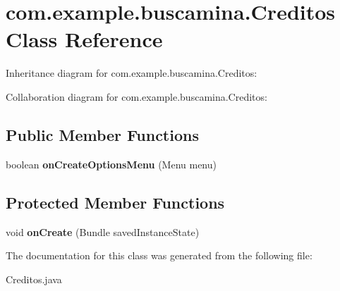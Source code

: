 \section{com.\-example.\-buscamina.\-Creditos Class Reference}
\label{classcom_1_1example_1_1buscamina_1_1_creditos}


Inheritance diagram for com.\-example.\-buscamina.\-Creditos\-:


Collaboration diagram for com.\-example.\-buscamina.\-Creditos\-:
\subsection*{Public Member Functions}
\begin{DoxyCompactItemize}
\item 
boolean {\bfseries on\-Create\-Options\-Menu} (Menu menu)\label{classcom_1_1example_1_1buscamina_1_1_creditos_a4a72bb27e1383d672884d5c0de0ad11a}

\end{DoxyCompactItemize}
\subsection*{Protected Member Functions}
\begin{DoxyCompactItemize}
\item 
void {\bfseries on\-Create} (Bundle saved\-Instance\-State)\label{classcom_1_1example_1_1buscamina_1_1_creditos_a6ca6e7da7009852da0cc02ec5d36e59e}

\end{DoxyCompactItemize}


The documentation for this class was generated from the following file\-:\begin{DoxyCompactItemize}
\item 
Creditos.\-java\end{DoxyCompactItemize}
